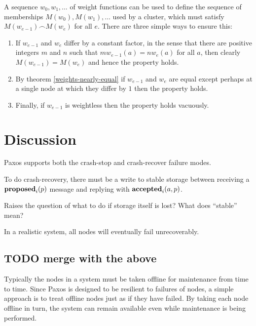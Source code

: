 \documentclass[journal]{IEEEtran}
\begin{document}
A sequence $w_0, w_1, \ldots$ of weight functions can be used to define the
sequence of memberships $M(w_0), M(w_1), \ldots$ used by a cluster, which must
satisfy $M(w_{e-1}) \frown M(w_e)$ for all $e$.  There are three simple ways to
ensure this:

\begin{enumerate}

\item If $w_{e-1}$ and $w_e$ differ by a constant factor, in the sense that
there are positive integers $m$ and $n$ such that $m w_{e-1}(a) = n w_e(a)$ for
all $a$, then clearly ${M(w_{e-1}) = M(w_e)}$ and hence the property holds.

\item By theorem \ref{weights-nearly-equal} if $w_{e-1}$ and $w_e$ are equal
except perhaps at a single node at which they differ by $1$ then the property
holds.

\item Finally, if $w_{e-1}$ is weightless then the property holds vacuously.

\end{enumerate}

\section{Discussion}\label{discussion}

Paxos supports both the crash-stop and crash-recover failure modes.

To do crash-recovery, there must be a write to stable storage between
receiving a $\mathbf{proposed}_{i}(p)$ message and replying with $\mathbf{accepted}_{i}(a,p)$.

Raises the question of what to do if storage itself is lost? What does
``stable'' mean?

In a realistic system, all nodes will eventually fail unrecoverably.





\subsection{TODO merge with the above}

Typically the nodes in a system must be taken offline for maintenance from time
to time. Since Paxos is designed to be resilient to failures of nodes, a simple
approach is to treat offline nodes just as if they have failed. By taking each
node offline in turn, the system can remain available even while maintenance is
being performed.
\end{document}
